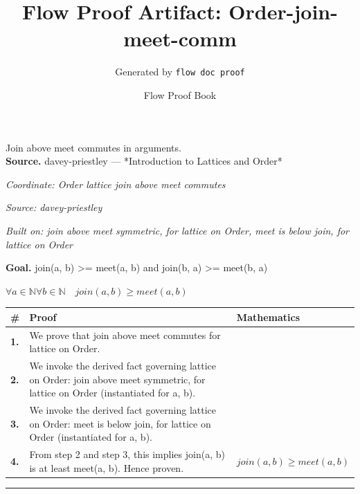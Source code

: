\documentclass[11pt]{article}
\title{Flow Proof Artifact: Order-join-meet-comm}
\author{Generated by \texttt{flow doc proof}}
\date{Flow Proof Book}
\theoremstyle{definition}
\begin{document}
\maketitle
Join above meet commutes in arguments.\\[0.5em]
\textbf{Source.} davey-priestley — *Introduction to Lattices and Order*\\[0.5em]
\bigskip
{}\par
\smallskip\noindent\textit{Coordinate: Order \cdot lattice \cdot join above meet commutes}\par
\smallskip\noindent\textit{Source: davey-priestley}\par
\smallskip\noindent\textit{Built on: join above meet symmetric, for lattice on Order, meet is below join, for lattice on Order}\par
\medskip
\noindent\textbf{Goal.} join(a, b) >= meet(a, b) and join(b, a) >= meet(b, a)\par
\noindent$\displaystyle \forall a \in \mathbb{N} \forall b \in \mathbb{N}\quad join(a, b) \ge meet(a, b)$\par
\medskip
\noindent
\begin{tabular}{@{} >{\raggedright\arraybackslash}p{} >{\raggedright\arraybackslash}p{} >{\raggedleft\arraybackslash}p{} @{}}
\textbf{\#} & \textbf{Proof} & \textbf{Mathematics} \\
\midrule
\textbf{1.} & We prove that join above meet commutes for lattice on Order. & \\[0.45em]
\textbf{2.} & We invoke the derived fact governing lattice on Order: join above meet symmetric, for lattice on Order (instantiated for a, b). & \\[0.45em]
\textbf{3.} & We invoke the derived fact governing lattice on Order: meet is below join, for lattice on Order (instantiated for a, b). & \\[0.45em]
\textbf{4.} & From step 2 and step 3, this implies join(a, b) is at least meet(a, b). Hence proven. & $\displaystyle join(a, b) \ge meet(a, b)$ \\[0.45em]
\bottomrule
\end{tabular}
\label{thm:Order-lattice-join_above_meet_commutes}
\par\medskip\hrule
\end{document}
